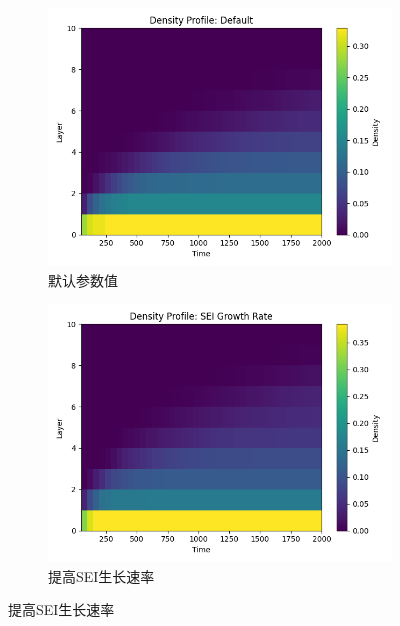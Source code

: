 \documentclass{article}
\begin{document}
 \begin{figure}[H]
     \centering
     \begin{subfigure}[b]{0.19\textwidth}
         \centering
         \includegraphics[scale=0.2]{figs/point_density_profile_default.png}
         \caption{默认参数值}
        
     \end{subfigure}
     \hfill
     \begin{subfigure}[b]{0.19\textwidth}
         \centering
         \includegraphics[scale=0.2]{figs/point_density_profile_sei_growth_rate.png}
         \caption{提高SEI生长速率}
       

\end{subfigure}
\end{figure}
\end{document}
